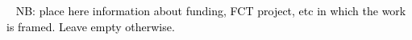 \documentclass[
  oneside,
  11pt, a4paper,
  footinclude=true,
  headinclude=true,
  cleardoublepage=empty
]{scrbook}
\begin{document}













\begin{backcover}
\thispagestyle{empty} \pagecolor{white} \textcolor{black} {\selectfont ~\vfill
\noindent
NB: place here information about funding, FCT project, etc in which the work is framed. Leave empty otherwise.
%
\vfill ~}
\end{backcover}
\end{document}
